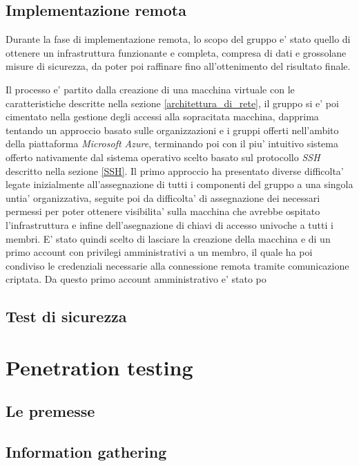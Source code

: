 \documentclass[a4paper]{report}
\begin{document}
	 \section{Implementazione remota} \label{implementazione_remota}
		Durante la fase di implementazione remota, lo scopo del gruppo e' stato quello di ottenere un infrastruttura
		funzionante e completa, compresa di dati e grossolane misure di sicurezza, da poter poi raffinare fino
		all'ottenimento del risultato finale.

		Il processo e' partito dalla creazione di una macchina virtuale con le caratteristiche descritte nella sezione
		\ref{architettura_di_rete}, il gruppo si e' poi cimentato nella gestione degli accessi alla sopracitata
		macchina, dapprima tentando un approccio basato sulle organizzazioni e i gruppi offerti nell'ambito della
		piattaforma \emph{Microsoft Azure}, terminando poi con il piu' intuitivo sistema offerto nativamente dal sistema
		operativo scelto basato sul protocollo \emph{SSH} descritto nella sezione \ref{SSH}.
		Il primo approccio ha presentato diverse difficolta' legate inizialmente all'assegnazione di tutti i componenti
		del gruppo a una singola untia' organizzativa, seguite poi da difficolta' di assegnazione dei necessari permessi
		per poter ottenere visibilita' sulla macchina che avrebbe ospitato l'infrastruttura e infine dell'asegnazione di
		chiavi di accesso univoche a tutti i membri. E' stato quindi scelto di lasciare la creazione della macchina e di
		un primo account con privilegi amministrativi a un membro, il quale ha poi condiviso le credenziali necessarie
		alla connessione remota tramite comunicazione criptata. Da questo primo account amministrativo e' stato po

	\section{Test di sicurezza} \label{test_di_sicurezza}

\chapter{Penetration testing} \label{penetration_testing}
	\section{Le premesse} \label{le_premesse}
	\section{Information gathering} \label{information_gathering}
\end{document}
